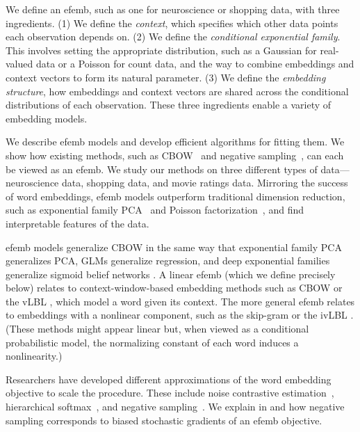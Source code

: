 \documentclass[12pt]{article}
\begin{document}
We define an \gls{efemb}, such as one for neuroscience or shopping
data, with three ingredients. (1) We define the \textit{context},
which specifies which other data points each observation depends
on. (2) We define the \textit{conditional exponential family}. This
involves setting the appropriate distribution, such as a Gaussian for
real-valued data or a Poisson for count data, and the way to combine
embeddings and context vectors to form its natural parameter.  (3) We
define the \textit{embedding structure}, how embeddings and context
vectors are shared across the conditional distributions of each
observation.  These three ingredients enable a variety of embedding
models.

We describe \gls{efemb} models and develop efficient algorithms for
fitting them. We show how existing methods, such as
\gls{CBOW}~\citep{mikolov2013efficient} and negative
sampling~\citep{mikolov2013distributed}, can each be viewed as an
\gls{efemb}. We study our methods on three different types of
data---neuroscience data, shopping data, and movie ratings data.
Mirroring the success of word embeddings, \gls{efemb} models
outperform traditional dimension reduction, such as exponential family
\gls{PCA}~\citep{collins2001generalization} and Poisson
factorization~\citep{Gopalan2015}, and find interpretable features of
the data.


  \gls{efemb} models generalize \gls{CBOW}
\citep{mikolov2013efficient} in the same way that exponential family
\gls{PCA} \citep{collins2001generalization} generalizes \gls{PCA},
\glspl{GLM} \citep{mccullagh1989generalized} generalize regression,
and deep exponential families \citep{ranganath2014deep} generalize
sigmoid belief networks \citep{neal1990learning}.  A linear
\gls{efemb} (which we define precisely below) relates to
context-window-based embedding methods such as \gls{CBOW} or the \gls{vLBL}
\citep{mikolov2013efficient,mnih2013learning}, which model a word
given its context. The more general \gls{efemb} relates to embeddings
with a nonlinear component, such as the skip-gram
\citep{mikolov2013efficient} or the \gls{ivLBL} \citep{mnih2013learning}.
(These methods might appear linear but, when viewed as a conditional
probabilistic model, the normalizing constant of each word induces a
nonlinearity.)

Researchers have developed different approximations of the word
embedding objective to scale the procedure.  These include noise
contrastive estimation~\citep{gutmann2010noise,mnih2012fast}, hierarchical
softmax~\citep{mikolov2013distributed}, and negative
sampling~\citep{mikolov2013efficient}.  We explain in
 and  how negative sampling corresponds to biased
stochastic gradients of an \gls{efemb} objective.
\end{document}
